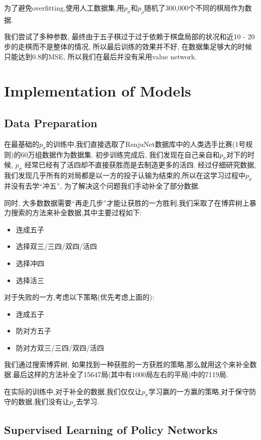 \documentclass[twocolumn]{article}
\begin{document}
为了避免overfitting,使用人工数据集,用$p_\sigma$和$p_\rho$随机了300,000个不同的棋局作为数据.

我们尝试了多种参数, 最终由于五子棋过于过于依赖于棋盘局部的状况和近10 - 20步的走棋而不是整体的情况, 所以最后训练的效果并不好, 在数据集足够大的时候只能达到0.8的MSE, 所以我们在最后并没有采用value network.

\section{Implementation of Models}

\subsection{Data Preparation}

在最基础的$p_\sigma$的训练中,我们直接选取了RenjuNet\cite{renjunet}数据库中的人类选手比赛(1号规则)的60万组数据作为数据集. 初步训练完成后, 我们发现在自己亲自和$p_\sigma$对下的时候, $p_\sigma$ 经常已经有了活四却不直接获胜而是去制造更多的活四. 经过仔细研究数据, 我们发现几乎所有的对局都是以一方的投子认输为结束的,所以在这学习过程中$p_\sigma$并没有去学“冲五”, 为了解决这个问题我们手动补全了部分数据.

同时, 大多数数据需要“再走几步”才能让获胜的一方胜利,我们采取了在博弈树上暴力搜索的方法来补全数据,其中主要过程如下:

\begin{itemize}
	\item 连成五子
	\item 选择双三/三四/双四/活四
	\item 选择冲四
	\item 选择活三
\end{itemize}

对于失败的一方,考虑以下策略(优先考虑上面的):

\begin{itemize}
	\item 连成五子
	\item 防对方五子
	\item 防对方双三/三四/双四/活四
\end{itemize}

我们通过搜索博弈树, 如果找到一种获胜的一方获胜的策略,那么就用这个来补全数据.最后这样的方法补全了15647局(其中有1000局左右的平局)中的7119局.

在实际的训练中,对于补全的数据,我们仅仅让$p_\sigma$学习赢的一方赢的策略,对于保守防守的数据,我们没有让$p_\sigma$去学习.

\subsection{Supervised Learning of Policy Networks}
\end{document}
